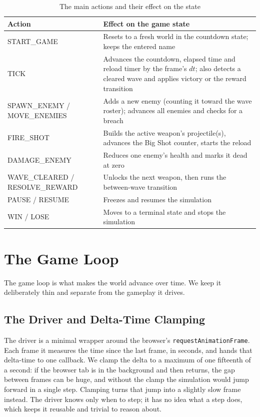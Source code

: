 \documentclass[12pt,a4paper]{report}
\begin{document}
\begin{table}[htbp]
\centering
\caption{The main actions and their effect on the state}
\label{tab:actions}
\begin{tabular}{|p{3.6cm}|p{9.0cm}|}
\hline
Action & Effect on the game state \\
\hline
START\_GAME & Resets to a fresh world in the countdown state; keeps the entered name \\
\hline
TICK & Advances the countdown, elapsed time and reload timer by the frame's $dt$; also detects a cleared wave and applies victory or the reward transition \\
\hline
SPAWN\_ENEMY / MOVE\_ENEMIES & Adds a new enemy (counting it toward the wave roster); advances all enemies and checks for a breach \\
\hline
FIRE\_SHOT & Builds the active weapon's projectile(s), advances the Big Shot counter, starts the reload \\
\hline
DAMAGE\_ENEMY & Reduces one enemy's health and marks it dead at zero \\
\hline
WAVE\_CLEARED / RESOLVE\_REWARD & Unlocks the next weapon, then runs the between-wave transition \\
\hline
PAUSE / RESUME & Freezes and resumes the simulation \\
\hline
WIN / LOSE & Moves to a terminal state and stops the simulation \\
\hline
\end{tabular}
\end{table}



\section{The Game Loop}

The game loop is what makes the world advance over time. We keep it deliberately
thin and separate from the gameplay it drives.

\subsection{The Driver and Delta-Time Clamping}

The driver is a minimal wrapper around the browser's
\texttt{requestAnimationFrame}. Each frame it measures the time since the last
frame, in seconds, and hands that delta-time to one callback. We clamp the delta
to a maximum of one fifteenth of a second: if the browser tab is in the
background and then returns, the gap between frames can be huge, and without the
clamp the simulation would jump forward in a single step. Clamping turns that
jump into a slightly slow frame instead. The driver knows only when to step; it
has no idea what a step does, which keeps it reusable and trivial to reason
about.
\end{document}
